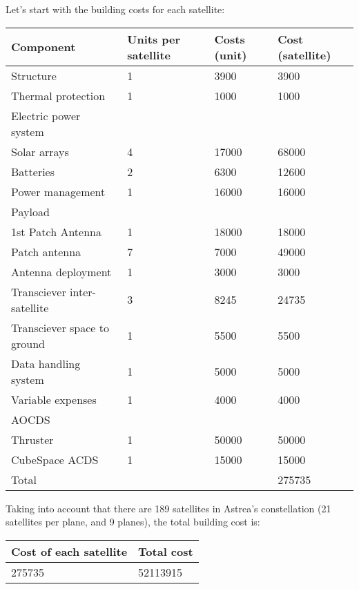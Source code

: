 Let's start with the building costs for each satellite:

\begin{center}
\begin{tabular}{ | l | l | l | l | }
\toprule
\hline
\rowcolor[gray]{0.75}
	Component & Units per satellite & Costs (unit) & Cost (satellite) \\ \hline
	Structure & 1 & 3900 & 3900 \\ \hline
	Thermal protection & 1 & 1000 & 1000 \\ \hline
	\rowcolor[gray]{0.85}
	Electric power system &  & \  & \  \\ \hline
	Solar arrays & 4 & 17000 & 68000 \\ \hline
	Batteries & 2 & 6300 & 12600 \\ \hline
	Power management & 1 & 16000 & 16000 \\ \hline
	\rowcolor[gray]{0.85}
	Payload &  & \  & \  \\ \hline
	1st Patch Antenna & 1 & 18000 & 18000 \\ \hline
	Patch antenna & 7 & 7000 & 49000 \\ \hline
	Antenna deployment & 1 & 3000 & 3000 \\ \hline
	Transciever inter-satellite & 3 & 8245 & 24735 \\ \hline
	Transciever space to ground & 1 & 5500 & 5500 \\ \hline
	Data handling system & 1 & 5000 & 5000 \\ \hline
	Variable expenses & 1 & 4000 & 4000 \\ \hline
	\rowcolor[gray]{0.85}
	AOCDS &  & \  & \  \\ \hline
	Thruster & 1 & 50000 & 50000 \\ \hline
	CubeSpace ACDS & 1 & 15000 & 15000 \\ \hline
	\rowcolor[gray]{0.65}
	Total &  & \  & 275735\  \\ \hline
	\bottomrule
\end{tabular}
\end{center}


Taking into account that there are 189 satellites in Astrea's constellation (21 satellites per plane, and 9 planes), the total building cost is:

\begin{center}
\begin{tabular}{ | l | l | }
\toprule
\hline
	\rowcolor[gray]{0.75}
	Cost of each satellite & Total cost \\ \hline
	275735 & 52113915 \\ \hline
	\bottomrule
\end{tabular}
\end{center}

